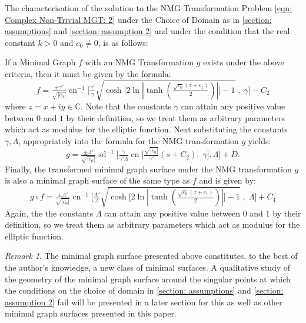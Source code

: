 \documentclass[12pt]{article}
\theoremstyle{plain}
\theoremstyle{definition}
\theoremstyle{remark}
\newtheorem{remark}[theorem]{Remark}
\begin{document}
  The characterisation of the solution to the NMG Transformation Problem \ref{eqn: Complex Non-Trivial MGT: 2} under the Choice of Domain as in \ref{section: assumptions} and \ref{section: assumption 2} and under the condition that the real constant \(k>0\) and \(c_0\neq0\), is as follows:  
  
  If a Minimal Graph \(f\) with an NMG Transformation \(g\) exists under the above criteria, then it must be given by the formula:
  \[
    \boxed{f=\tfrac{\pm \gamma'}{\sqrt{|c_0|}}\operatorname{cn}^{-1}\Big[\tfrac{\gamma'}{\gamma}\sqrt{\cosh\big[2\ln|\tanh(\tfrac{\sqrt{c_0}(z + c_1)}{2})|\big]-1}\;,\;\gamma\Big]-C_2}
  \]
  where \(z=x+iy\in\mathbb{C}\). Note that the constants \(\gamma\) can attain any positive value between \(0\) and \(1\) by their definition, so we treat them as arbitrary parameters which act as modulus for the elliptic function. Next substituting the constants \(\gamma, \Lambda\), appropriately into the formula for the NMG transformation \(g\) yields:
  \[
  \boxed{g=\tfrac{\pm \Lambda'}{\sqrt{|c_0|}}\operatorname{sd}^{-1}\Big[\tfrac{\gamma}{\gamma'\Lambda}\operatorname{cn}\big[\tfrac{\sqrt{|c_0|}}{\gamma'}(s+C_2),\;\gamma\big],\Lambda\Big]+D.}
  \]
  Finally, the transformed minimal graph surface under the NMG transformation \(g\) is also a minimal graph surface of the same type as \(f\) and is given by:
  \[
   \boxed{ g\circ f=\tfrac{\pm \Lambda'}{\sqrt{|c_0|}}\operatorname{cn}^{-1}\Big[\tfrac{\Lambda'}{\Lambda}\sqrt{\cosh\big[2\ln|\tanh(\tfrac{\sqrt{c_0}(z + c_1)}{2})|\big]-1}\;,\;\Lambda\Big]+C_4}
  \]
  Again, the the constants \(\Lambda\) can attain any positive value between \(0\) and \(1\) by their definition, so we treat them as arbitrary parameters which act as modulus for the elliptic function.
  \begin{remark}
  	The minimal graph surface presented above constitutes, to the best of the author's knowledge, a new class of minimal surfaces. A qualitative study of the geometry of the minimal graph surface around the singular points at which the conditions on the choice of domain in \ref{section: assumptions} and \ref{section: assumption 2} fail will be presented in a later section for this as well as other minimal graph surfaces presented in this paper.
  \end{remark}
\end{document}
